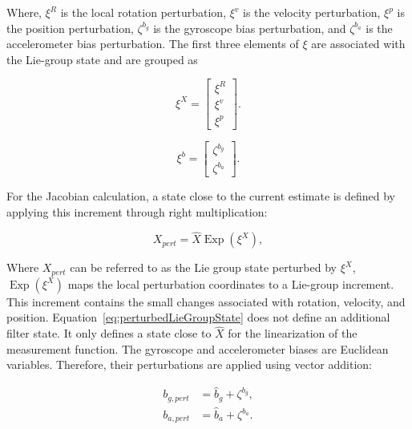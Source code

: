 \documentclass[report.tex]{subfiles}
\begin{document}
    Where, $\xi^R$ is the local rotation perturbation, $\xi^v$ is the velocity perturbation, $\xi^p$ is the position perturbation, $\zeta^{b_g}$ is the gyroscope bias perturbation, and $\zeta^{b_a}$ is the accelerometer bias perturbation. The first three elements of $\xi$ are associated with the Lie-group state and are grouped as
    
    \begin{equation}
        \xi^X
        =
        \begin{bmatrix}
            \xi^R \\
            \xi^v \\
            \xi^p
        \end{bmatrix}.
        \label{eq:LieGroupErrorState}
    \end{equation}

    \begin{equation}
        \xi^b
        =
        \begin{bmatrix}
            \zeta^{b_g} \\
            \zeta^{b_a} 
        \end{bmatrix}.
        \label{eq:BiasesErrorState}
    \end{equation}
    
    For the Jacobian calculation, a state close to the current estimate is defined by applying this increment through right multiplication:

    \begin{equation}
        X_{pert}
        =
        \hat{X}
        \operatorname{Exp}(\xi^X),
        \label{eq:perturbedLieGroupState}
    \end{equation}

    Where $X_{pert}$ can be referred to as the Lie group state perturbed by $\xi^{X}$, $\operatorname{Exp}(\xi^X)$ maps the local perturbation coordinates to a Lie-group increment. This increment contains the small changes associated with rotation, velocity, and position. Equation~\ref{eq:perturbedLieGroupState} does not define an additional filter state. It only defines a state close to $\hat{X}$ for the linearization of the measurement function. The gyroscope and accelerometer biases are Euclidean variables. Therefore, their perturbations are applied using vector addition:

    \begin{align}
        {b_{g, pert}}
        &=
        \hat{b}_g+ \zeta^{b_g},
        \label{eq:perturbedGyroBias}
        \\
        {b_{a, pert}}
        &=
        \hat{b}_a+\zeta^{b_a}.
        \label{eq:perturbedAccelerometerBias}
    \end{align}
        
\end{document}
